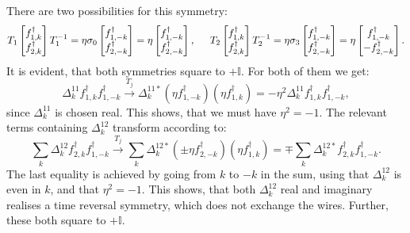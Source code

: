 There are two possibilities for this symmetry: 
\begin{equation}
T_1 \begin{bmatrix} f^\dagger_{1,k} \\ f^\dagger_{2,k} \end{bmatrix} T_1^{-1} = \eta\sigma_0 \begin{bmatrix} f^\dagger_{1,-k} \\ f^\dagger_{2,-k} \end{bmatrix} = \eta\begin{bmatrix} f^\dagger_{1,-k} \\ f^\dagger_{2,-k} \end{bmatrix}, \hspace{0.5cm} T_2 \begin{bmatrix} f^\dagger_{1,k} \\ f^\dagger_{2,k} \end{bmatrix} T_2^{-1} = \eta\sigma_3 \begin{bmatrix} f^\dagger_{1,-k} \\ f^\dagger_{2,-k} \end{bmatrix} = \eta\begin{bmatrix} f^\dagger_{1,-k} \\  - f^\dagger_{2,-k} \end{bmatrix}. \nonumber
\end{equation} 
It is evident, that both symmetries square to $+\mathbb{I}$. For both of them we get: 
\begin{equation}
\Delta^{11}_k f^\dagger_{1,k}f^\dagger_{1,-k} \overset{T_j}{\to} \Delta^{11*}_k \left(\eta f^\dagger_{1,-k}\right)\left(\eta f^\dagger_{1,k}\right) = -\eta^2\Delta^{11}_k f^\dagger_{1,k}f^\dagger_{1,-k}, \nonumber
\end{equation}
since $\Delta^{11}_k$ is chosen real. This shows, that we must have $\eta^2 = -1$. The relevant terms containing $\Delta^{12}_k$ transform according to:
\begin{equation}
\sum_k \Delta^{12}_k f^\dagger_{2,k}f^\dagger_{1,-k} \overset{T_j}{\to} \sum_k \Delta^{12*}_k \left(\pm \eta f^\dagger_{2,-k}\right)\left( \eta f^\dagger_{1,k}\right) = \mp \sum_k \Delta^{12*}_{k} f^\dagger_{2,k}f^\dagger_{1,-k}. \nonumber
\end{equation}
The last equality is achieved by going from $k$ to $-k$ in the sum, using that $\Delta^{12}_k$ is even in $k$, and that $\eta^2 = -1$. This shows, that both $\Delta^{12}_k$ real and imaginary realises a time reversal symmetry, which does not exchange the wires. Further, these both square to $+\mathbb{I}$. 

